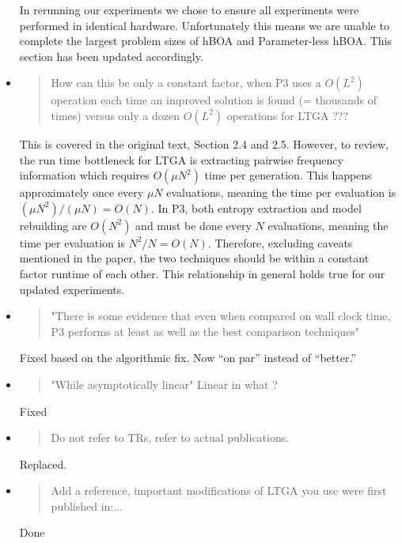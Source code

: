 \documentclass[]{article}
\begin{document}
\begin{itemize}
In rerunning our experiments we chose to ensure all experiments were performed in identical hardware. Unfortunately this means we are unable
to complete the largest problem sizes of hBOA and Parameter-less hBOA. This section has been updated accordingly.

\item
\begin{quote}
How can this be only a constant factor, when P3 uses a $O(L^2)$ operation each time an improved solution is found (= thousands of times) versus only a dozen $O(L^2)$ operations for LTGA ???
\end{quote}

This is covered in the original text, Section 2.4 and 2.5. However, to review,
the run time bottleneck for LTGA is extracting pairwise frequency information which
requires $O(\mu N^2)$ time per generation. This happens approximately once every $\mu N$ evaluations,
meaning the time per evaluation is $(\mu N^2) / (\mu N) = O(N)$.
In P3, both entropy extraction and model rebuilding are $O(N^2)$ and must be done every $N$ evaluations,
meaning the time per evaluation is $N^2 / N = O(N)$. Therefore, excluding caveats mentioned in the paper,
the two techniques should be within a constant factor runtime of each other.
This relationship in general holds true for our updated experiments.


\item
\begin{quote}
 "There is some evidence that even when compared on wall clock time, P3 performs at least as well as the best comparison techniques"
\end{quote}

Fixed based on the algorithmic fix. Now ``on par'' instead of ``better.''

\item
\begin{quote}
"While asymptotically linear"   Linear in what ?
\end{quote}

Fixed

\item
\begin{quote}
 Do not refer to TRs, refer to actual publications.
\end{quote}

Replaced.

\item
\begin{quote}
Add a reference, important modifications of LTGA you use were first published in:...
\end{quote}

Done
\end{itemize}
\end{document}
